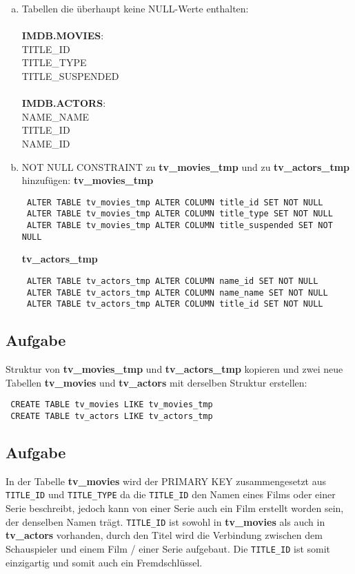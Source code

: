 \documentclass[11pt,a4paper,DIV=9]{scrartcl}
\newcounter{temp}
\newcommand{\aufgabe}[1]{
  \setcounter{temp}{\value{subsection}}
  \setcounter{subsection}{#1}
  \addtocounter{subsection}{-1}
  \subsection{Aufgabe}
  \setcounter{subsection}{\value{temp}}
}
\begin{document}
 \begin{enumerate}[a.]
 \item
 Tabellen die \"uberhaupt keine NULL-Werte enthalten: \\\\
 \textbf{IMDB.MOVIES}: \\
 TITLE\_ID \\
 TITLE\_TYPE \\
 TITLE\_SUSPENDED \\\\
 \textbf{IMDB.ACTORS}: \\
 NAME\_NAME \\
 TITLE\_ID \\
 NAME\_ID \\
 \item
 NOT NULL CONSTRAINT zu \textbf{tv\_movies\_tmp} und zu \textbf{tv\_actors\_tmp} hinzuf\"ugen: 
 \textbf{tv\_movies\_tmp}
 \begin{lstlisting}
 ALTER TABLE tv_movies_tmp ALTER COLUMN title_id SET NOT NULL
 ALTER TABLE tv_movies_tmp ALTER COLUMN title_type SET NOT NULL
 ALTER TABLE tv_movies_tmp ALTER COLUMN title_suspended SET NOT NULL
 \end{lstlisting}
 \textbf{tv\_actors\_tmp}
 \begin{lstlisting}
 ALTER TABLE tv_actors_tmp ALTER COLUMN name_id SET NOT NULL
 ALTER TABLE tv_actors_tmp ALTER COLUMN name_name SET NOT NULL
 ALTER TABLE tv_actors_tmp ALTER COLUMN title_id SET NOT NULL
 \end{lstlisting} 
 \end{enumerate}
 \aufgabe{4}
 Struktur von \textbf{tv\_movies\_tmp} und \textbf{tv\_actors\_tmp} kopieren und zwei neue Tabellen \textbf{tv\_movies} und \textbf{tv\_actors} mit derselben Struktur erstellen: 
 \begin{lstlisting}
 CREATE TABLE tv_movies LIKE tv_movies_tmp
 CREATE TABLE tv_actors LIKE tv_actors_tmp
 \end{lstlisting}
 \aufgabe{5}
 In der Tabelle \textbf{tv\_movies} wird der PRIMARY KEY zusammengesetzt aus \texttt{TITLE\_ID} und \texttt{TITLE\_TYPE} da die \texttt{TITLE\_ID} den Namen eines Films oder einer Serie beschreibt, jedoch kann von einer Serie auch ein Film erstellt worden sein, der denselben Namen tr\"agt. \texttt{TITLE\_ID} ist sowohl in \textbf{tv\_movies} als auch in \textbf{tv\_actors} vorhanden, durch den Titel wird die Verbindung zwischen dem Schauspieler und einem Film / einer Serie aufgebaut. Die \texttt{TITLE\_ID} ist somit einzigartig und somit auch ein Fremdschl\"ussel.
\end{document}
